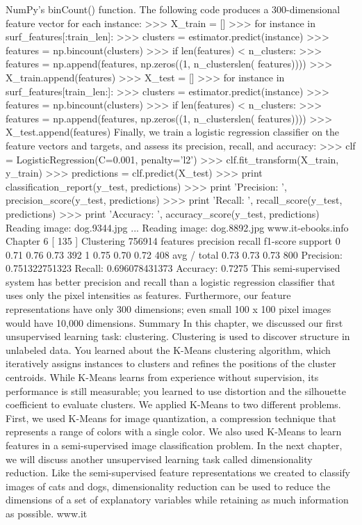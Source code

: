 NumPy's binCount() function. The following code produces a 300-dimensional
feature vector for each instance:
>>> X_train = []
>>> for instance in surf_features[:train_len]:
>>> clusters = estimator.predict(instance)
>>> features = np.bincount(clusters)
>>> if len(features) < n_clusters:
>>> features = np.append(features, np.zeros((1, n_clusterslen(
features))))
>>> X_train.append(features)
>>> X_test = []
>>> for instance in surf_features[train_len:]:
>>> clusters = estimator.predict(instance)
>>> features = np.bincount(clusters)
>>> if len(features) < n_clusters:
>>> features = np.append(features, np.zeros((1, n_clusterslen(
features))))
>>> X_test.append(features)
Finally, we train a logistic regression classifier on the feature vectors and targets,
and assess its precision, recall, and accuracy:
>>> clf = LogisticRegression(C=0.001, penalty='l2')
>>> clf.fit_transform(X_train, y_train)
>>> predictions = clf.predict(X_test)
>>> print classification_report(y_test, predictions)
>>> print 'Precision: ', precision_score(y_test, predictions)
>>> print 'Recall: ', recall_score(y_test, predictions)
>>> print 'Accuracy: ', accuracy_score(y_test, predictions)
Reading image: dog.9344.jpg
...
Reading image: dog.8892.jpg
www.it-ebooks.info
Chapter 6
[ 135 ]
Clustering 756914 features
precision recall f1-score support
0 0.71 0.76 0.73 392
1 0.75 0.70 0.72 408
avg / total 0.73 0.73 0.73 800
Precision: 0.751322751323
Recall: 0.696078431373
Accuracy: 0.7275
This semi-supervised system has better precision and recall than a logistic regression
classifier that uses only the pixel intensities as features. Furthermore, our feature
representations have only 300 dimensions; even small 100 x 100 pixel images would
have 10,000 dimensions.
Summary
In this chapter, we discussed our first unsupervised learning task: clustering.
Clustering is used to discover structure in unlabeled data. You learned about the
K-Means clustering algorithm, which iteratively assigns instances to clusters and
refines the positions of the cluster centroids. While K-Means learns from experience
without supervision, its performance is still measurable; you learned to use distortion
and the silhouette coefficient to evaluate clusters. We applied K-Means to two
different problems. First, we used K-Means for image quantization, a compression
technique that represents a range of colors with a single color. We also used K-Means
to learn features in a semi-supervised image classification problem.
In the next chapter, we will discuss another unsupervised learning task called
dimensionality reduction. Like the semi-supervised feature representations we
created to classify images of cats and dogs, dimensionality reduction can be used
to reduce the dimensions of a set of explanatory variables while retaining as much
information as possible.
www.it